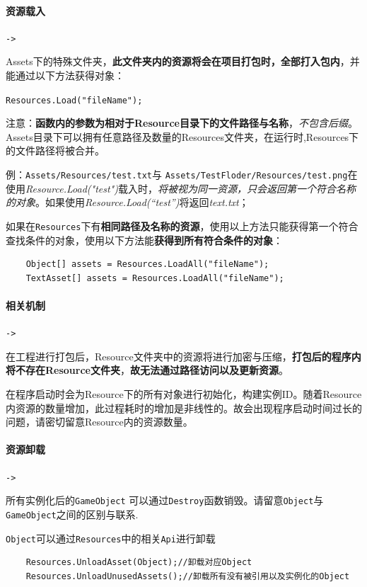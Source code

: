 \documentclass[UTF8,a4paper,12pt]{ctexbook}
\begin{document}
			\paragraph{资源载入}\verb|->|
			
				Assets下的特殊文件夹，\textbf{此文件夹内的资源将会在项目打包时，全部打入包内}，并能通过以下方法获得对象：

					\verb|Resources.Load("fileName");|
					
		        注意：\textbf{函数内的参数为相对于Resource目录下的文件路径与名称}，\textit{不包含后缀}。Assets目录下可以拥有任意路径及数量的Resources文件夹，在运行时,Resources下的文件路径将被合并。
					
		        例：\verb|Assets/Resources/test.txt|与 \verb|Assets/TestFloder/Resources/test.png|在使用\textit{Resource.Load("test")}载入时，\textit{将被视为同一资源，只会返回第一个符合名称的对象}。如果使用\textit{Resource.Load(“test”)}将返回\textit{text.txt}；
					
		        如果在\verb|Resources|下有\textbf{相同路径及名称的资源}，使用以上方法只能获得第一个符合查找条件的对象，使用以下方法能\textbf{获得到所有符合条件的对象}：
					\begin{lstlisting}
	Object[] assets = Resources.LoadAll("fileName");
	TextAsset[] assets = Resources.LoadAll("fileName");
					\end{lstlisting}
				 		 
			
			\paragraph{相关机制}\verb|->|
				
				在工程进行打包后，Resource文件夹中的资源将进行加密与压缩，\textbf{打包后的程序内将不存在Resource文件夹}，\textbf{故无法通过路径访问以及更新资源}。
				
				在程序启动时会为Resource下的所有对象进行初始化，构建实例ID。随着Resource内资源的数量增加，此过程耗时的增加是非线性的。故会出现程序启动时间过长的问题，请密切留意Resource内的资源数量。

			\paragraph{资源卸载}\verb|->|	
					
				所有实例化后的\verb|GameObject| 可以通过\verb|Destroy|函数销毁。请留意\verb|Object|与\verb|GameObject|之间的区别与联系.
				
				\verb|Object|可以通过\verb|Resources|中的相关\verb|Api|进行卸载
					\begin{lstlisting}
	Resources.UnloadAsset(Object);//卸载对应Object 
	Resources.UnloadUnusedAssets();//卸载所有没有被引用以及实例化的Object
					\end{lstlisting}
\end{document}
